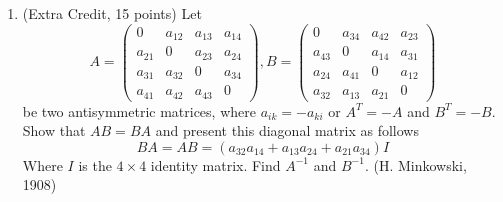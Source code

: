 \documentclass[fleqn]{article}
\begin{document}
\begin{enumerate}
    \item  (Extra Credit, 15 points) Let
    $$
      A=\begin{pmatrix}
        0 & a_{12} & a_{13} & a_{14}
        \\
        a_{21} & 0 & a_{23} & a_{24}
        \\
        a_{31} & a_{32} & 0 & a_{34}
        \\
        a_{41} & a_{42} & a_{43} & 0
      \end{pmatrix}
      , B=\begin{pmatrix}
        0 & a_{34} & a_{42} & a_{23}
        \\
        a_{43} & 0 & a_{14} & a_{31}
        \\
        a_{24} & a_{41} & 0 & a_{12}
        \\
        a_{32} & a_{13} & a_{21} & 0
      \end{pmatrix}
    $$
    be two antisymmetric matrices, where $a_{ik}=-a_{ki}$ or $A^T=-A$ and $B^T=-B$. Show that 
    $AB=BA$ and present this diagonal matrix as follows
    $$
      BA=AB=\left(a_{32} a_{14}+a_{13} a_{24}+a_{21} a_{34}\right) I
    $$ 
    Where $I$ is the $4 \times 4$ identity matrix. Find $A^{-1}$ and $B^{-1}$. (H. Minkowski, 1908)


\end{enumerate}
\end{document}
